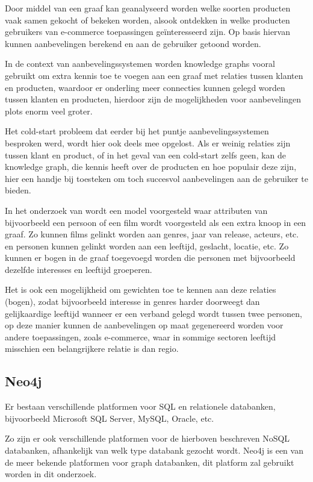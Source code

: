 Door middel van een graaf kan geanalyseerd worden welke soorten producten vaak samen gekocht of bekeken worden, alsook ontdekken in welke producten gebruikers van e-commerce toepassingen geïnteresseerd zijn. Op basis hiervan kunnen aanbevelingen berekend en aan de gebruiker getoond worden. 

In de context van aanbevelingssystemen worden knowledge graphs vooral gebruikt om extra kennis toe te voegen aan een graaf met relaties tussen klanten en producten, waardoor er onderling meer connecties kunnen gelegd worden tussen klanten en producten, hierdoor zijn de mogelijkheden voor aanbevelingen plots enorm veel groter.
 
Het cold-start probleem dat eerder bij het puntje aanbevelingssystemen besproken werd, wordt hier ook deels mee opgelost. Als er weinig relaties zijn tussen klant en product, of in het geval van een cold-start zelfs geen, kan de knowledge graph, die kennis heeft over de producten en hoe populair deze zijn, hier een handje bij toesteken om toch succesvol aanbevelingen aan de gebruiker te bieden.

In het onderzoek van \cite{Grad-Gyenge2015} wordt een model voorgesteld waar attributen van bijvoorbeeld een persoon of een film wordt voorgesteld als een extra knoop in een graaf. Zo kunnen films gelinkt worden aan genres, jaar van release, acteurs, etc. en personen kunnen gelinkt worden aan een leeftijd, geslacht, locatie, etc.
Zo kunnen er bogen in de graaf toegevoegd worden die personen met bijvoorbeeld dezelfde interesses en leeftijd groeperen. 

Het is ook een mogelijkheid om gewichten toe te kennen aan deze relaties (bogen), zodat bijvoorbeeld interesse in genres harder doorweegt dan gelijkaardige leeftijd wanneer er een verband gelegd wordt tussen twee personen, op deze manier kunnen de aanbevelingen op maat gegenereerd worden voor andere toepassingen, zoals e-commerce, waar in sommige sectoren leeftijd misschien een belangrijkere relatie is dan regio.

\subsection{Neo4j}
\label{sec:Neo4j}

Er bestaan verschillende platformen voor SQL en relationele databanken, bijvoorbeeld Microsoft SQL Server, MySQL, Oracle, etc.
  
Zo zijn er ook verschillende platformen voor de hierboven beschreven NoSQL databanken, afhankelijk van welk type databank gezocht wordt. Neo4j is een van de meer bekende platformen voor graph databanken, dit platform zal gebruikt worden in dit onderzoek.

